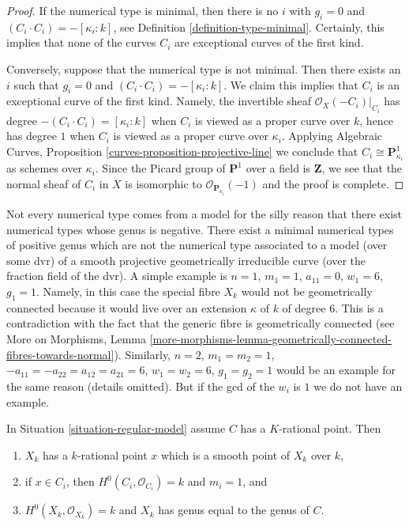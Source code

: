 \begin{proof}
If the numerical type is minimal, then there is no $i$ with
$g_i = 0$ and $(C_i \cdot C_i) = -[\kappa_i: k]$, see
Definition \ref{definition-type-minimal}.
Certainly, this implies that none of the curves $C_i$
are exceptional curves of the first kind.

\medskip\noindent
Conversely, suppose that the numerical type is not minimal.
Then there exists an $i$ such that $g_i = 0$ and
$(C_i \cdot C_i) = -[\kappa_i: k]$.
We claim this implies that $C_i$ is an exceptional curve
of the first kind. Namely, the invertible sheaf
$\mathcal{O}_X(-C_i)|_{C_i}$ has degree $-(C_i \cdot C_i) = [\kappa_i : k]$
when $C_i$ is viewed as a proper curve over $k$, hence
has degree $1$ when $C_i$ is viewed as a proper curve over $\kappa_i$.
Applying
Algebraic Curves, Proposition \ref{curves-proposition-projective-line}
we conclude that $C_i \cong \mathbf{P}^1_{\kappa_i}$ as schemes
over $\kappa_i$. Since the Picard group of $\mathbf{P}^1$
over a field is $\mathbf{Z}$, we see that the normal sheaf
of $C_i$ in $X$ is isomorphic to $\mathcal{O}_{\mathbf{P}_{\kappa_i}}(-1)$
and the proof is complete.
\end{proof}

\begin{remark}
\label{remark-numerical-type-not-from-model}
Not every numerical type comes from a model for the silly reason
that there exist numerical types whose genus is negative.
There exist a minimal numerical types of positive genus which
are not the numerical type associated to a model (over some dvr)
of a smooth projective geometrically irreducible curve (over the
fraction field of the dvr). A simple example is
$n = 1$, $m_1 = 1$, $a_{11} = 0$, $w_1 = 6$, $g_1 = 1$.
Namely, in this case the special fibre $X_k$ would not be
geometrically connected because it would live over an extension
$\kappa$ of $k$ of degree $6$. This is a contradiction with the
fact that the generic fibre is geometrically connected (see
More on Morphisms, Lemma
\ref{more-morphisms-lemma-geometrically-connected-fibres-towards-normal}).
Similarly, $n = 2$, $m_1 = m_2 = 1$, $-a_{11} = -a_{22} = a_{12} = a_{21} = 6$,
$w_1 = w_2 = 6$, $g_1 = g_2 = 1$ would be an example
for the same reason (details omitted). But if the gcd of
the $w_i$ is $1$ we do not have an example.
\end{remark}

\begin{lemma}
\label{lemma-numerical-type-rational-point}
In Situation \ref{situation-regular-model} assume $C$ has a $K$-rational point.
Then
\begin{enumerate}
\item $X_k$ has a $k$-rational point $x$ which is a smooth point of $X_k$
over $k$,
\item if $x \in C_i$, then $H^0(C_i, \mathcal{O}_{C_i}) = k$ and
$m_i = 1$, and
\item $H^0(X_k, \mathcal{O}_{X_k}) = k$ and $X_k$ has genus equal to
the genus of $C$.
\end{enumerate}
\end{lemma}

